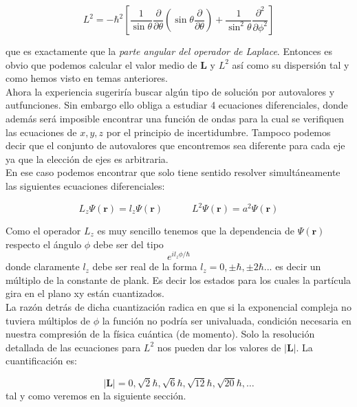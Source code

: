 \documentclass[12pt]{article}
\newcommand{\parentesis}[1]{\left( #1  \right)}
\newcommand{\parciales}[2]{\frac{\partial #1}{\partial #2}}
\newcommand{\ccorchetes}[1]{\left[ #1  \right]}
\newcommand{\tquad}{\quad \quad \quad}
\newcommand{\rn}{\mathbf{r}}
\newcommand{\Ln}{\mathbf{L}}
\begin{document}
\begin{equation}
L^2 = - \hbar^2 \ccorchetes{\dfrac{1}{\sin \theta} \parciales{}{\theta} \parentesis{\sin \theta \parciales{}{\theta}} + \dfrac{1}{\sin^2 \theta} \parciales{^2}{\phi^2}} \label{Ec:funcionangularcuadrado}
\end{equation}


que es exactamente que la \textit{parte angular del operador de Laplace}. Entonces es obvio que podemos calcular el valor medio de $\Ln$ y $L^2$ así como su dispersión tal y como hemos visto en temas anteriores. \\

Ahora la experiencia sugeriría buscar algún tipo de solución por autovalores y autfunciones. Sin embargo ello obliga a estudiar 4 ecuaciones diferenciales, donde además será imposible encontrar una función de ondas para la cual se verifiquen las ecuaciones de $x,y,z$ por el principio de incertidumbre. Tampoco podemos decir que el conjunto de autovalores que encontremos sea diferente para cada eje ya que la elección de ejes es arbitraria. \\

En ese caso podemos encontrar que solo tiene sentido resolver simultáneamente las siguientes ecuaciones diferenciales:

\begin{equation}
L_z \Psi (\rn) = l_z \Psi (\rn) \tquad L^2 \Psi (\rn) = a^2 \Psi (\rn) \label{Ec:autoestadosmomentoangular}
\end{equation}

Como el operador $L_z$ es muy sencillo tenemos que la dependencia de $\Psi(\rn)$ respecto el ángulo $\phi$ debe ser del tipo $$ e^{i l_z \phi/\hbar}$$ donde claramente $l_z$ debe ser real de la forma $l_z =0, \pm \hbar, \pm 2 \hbar...$ es decir un múltiplo de la constante de plank. Es decir los estados para los cuales la partícula gira en el plano xy están cuantizados. \\

La razón detrás de dicha cuantización radica en que si la exponencial compleja no tuviera múltiplos de $\phi$ la función no podría ser univaluada, condición necesaria en nuestra compresión de la física cuántica (de momento). Solo la resolución detallada de las ecuaciones para $L^2$ nos pueden dar los valores de $|\Ln|$. La cuantificación es:

\begin{equation}
| \Ln | = 0, \sqrt{2} \hbar, \sqrt{6} \hbar, \sqrt{12} \hbar, \sqrt{20} \hbar, \ldots
\end{equation}
tal y como veremos en la siguiente sección.
\end{document}
